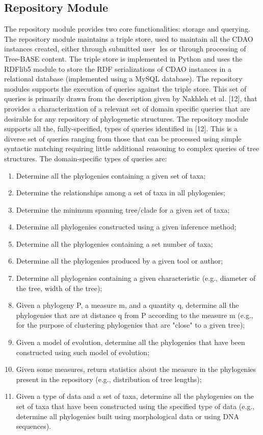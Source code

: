 \documentclass[10pt]{article}
\begin{document}
\subsection{Repository Module}
The repository module provides two core functionalities: storage and querying. The repository module maintains a triple store, used to maintain all
the CDAO instances created, either through submitted user les or through processing of Tree-BASE content. The triple store is implemented in
Python and uses the RDFlib5 module to store the RDF serializations of CDAO instances in a relational database (implemented using a MySQL database).
The repository modules supports the execution of queries against the triple store. This set of queries is primarily drawn from the description given by Nakhleh et al. [12], 
that provides a characterization of a relevant set of domain specific queries that are desirable for any repository of phylogenetic structures. The repository module supports
 all the, fully-specified, types of queries identified in [12]. This is a diverse set of queries ranging from those that can be processed using simple syntactic matching requiring little additional reasoning to complex queries of tree structures. The domain-specific types of queries are:
\begin{enumerate}
\item Determine all the phylogenies containing a given set of taxa;
\item Determine the relationships among a set of taxa in all phylogenies;
\item Determine the minimum spanning tree/clade for a given set of taxa;
\item Determine all phylogenies constructed using a given inference method;
\item Determine all the phylogenies containing a set number of taxa;
\item Determine all the phylogenies produced by a given tool or author;
\item Determine all phylogenies containing a given characteristic (e.g., diameter of the tree, width of the tree);
\item Given a phylogeny P, a measure m, and a quantity q, determine all the phylogenies that are at distance q from P according to the measure m (e.g., for the purpose of clustering phylogenies that are "close" to a given tree);
\item Given a model of evolution, determine all the phylogenies that have been constructed using such model of evolution;
\item Given some measures, return statistics about the measure in the phylogenies present in the repository (e.g., distribution of tree lengths);
\item Given a type of data and a set of taxa, determine all the phylogenies on the set of taxa that have been constructed using the specified type of data (e.g., determine all phylogenies built using morphological data or using DNA sequences).
\end{enumerate}
\end{document}
